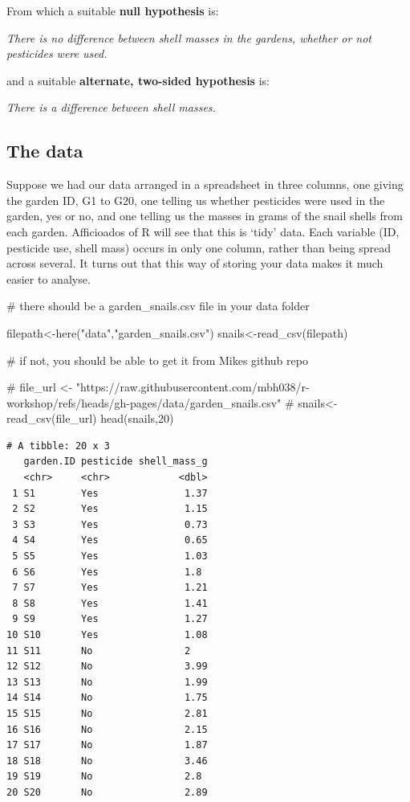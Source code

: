 \documentclass[
  letterpaper,
  DIV=11,
  numbers=noendperiod]{scrreprt}
\newenvironment{Shaded}{\begin{snugshade}}{\end{snugshade}}
\newcommand{\CommentTok}[1]{\textcolor[rgb]{0.37,0.37,0.37}{#1}}
\newcommand{\DecValTok}[1]{\textcolor[rgb]{0.68,0.00,0.00}{#1}}
\newcommand{\FunctionTok}[1]{\textcolor[rgb]{0.28,0.35,0.67}{#1}}
\newcommand{\NormalTok}[1]{\textcolor[rgb]{0.00,0.23,0.31}{#1}}
\newcommand{\OtherTok}[1]{\textcolor[rgb]{0.00,0.23,0.31}{#1}}
\newcommand{\StringTok}[1]{\textcolor[rgb]{0.13,0.47,0.30}{#1}}
\begin{document}
From which a suitable \textbf{null hypothesis} is:

\emph{There is no difference between shell masses in the gardens,
whether or not pesticides were used.}

and a suitable \textbf{alternate, two-sided hypothesis} is:

\emph{There is a difference between shell masses.}

\subsection{The data}\label{the-data}

Suppose we had our data arranged in a spreadsheet in three columns, one
giving the garden ID, G1 to G20, one telling us whether pesticides were
used in the garden, yes or no, and one telling us the masses in grams of
the snail shells from each garden. Afficioados of R will see that this
is `tidy' data. Each variable (ID, pesticide use, shell mass) occurs in
only one column, rather than being spread across several. It turns out
that this way of storing your data makes it much easier to analyse.

\begin{Shaded}
\begin{Highlighting}[]
\CommentTok{\# there should be a \textquotesingle{}garden\_snails.csv\textquotesingle{} file in your data folder}

\NormalTok{filepath}\OtherTok{\textless{}{-}}\FunctionTok{here}\NormalTok{(}\StringTok{"data"}\NormalTok{,}\StringTok{"garden\_snails.csv"}\NormalTok{)}
\NormalTok{snails}\OtherTok{\textless{}{-}}\FunctionTok{read\_csv}\NormalTok{(filepath)}

\CommentTok{\# if not, you should be able to get it from Mike\textquotesingle{}s github repo}

\CommentTok{\# file\_url \textless{}{-} "https://raw.githubusercontent.com/mbh038/r{-}workshop/refs/heads/gh{-}pages/data/garden\_snails.csv"}
\CommentTok{\# snails\textless{}{-}read\_csv(file\_url)}
\FunctionTok{head}\NormalTok{(snails,}\DecValTok{20}\NormalTok{)}
\end{Highlighting}
\end{Shaded}

\begin{verbatim}
# A tibble: 20 x 3
   garden.ID pesticide shell_mass_g
   <chr>     <chr>            <dbl>
 1 S1        Yes               1.37
 2 S2        Yes               1.15
 3 S3        Yes               0.73
 4 S4        Yes               0.65
 5 S5        Yes               1.03
 6 S6        Yes               1.8 
 7 S7        Yes               1.21
 8 S8        Yes               1.41
 9 S9        Yes               1.27
10 S10       Yes               1.08
11 S11       No                2   
12 S12       No                3.99
13 S13       No                1.99
14 S14       No                1.75
15 S15       No                2.81
16 S16       No                2.15
17 S17       No                1.87
18 S18       No                3.46
19 S19       No                2.8 
20 S20       No                2.89
\end{verbatim}
\end{document}
